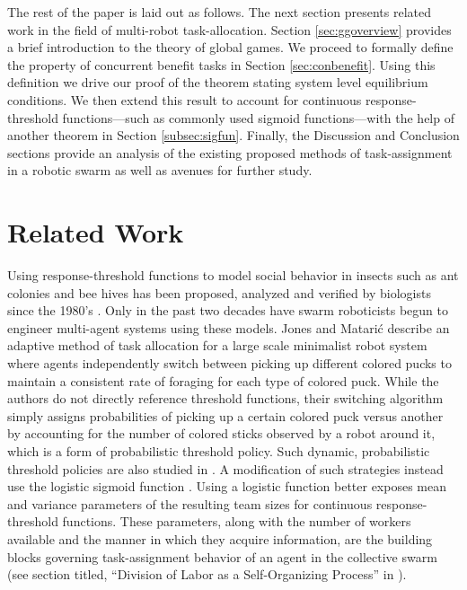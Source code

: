 \documentclass[conference]{ieeeconf}
\begin{document}
The rest of the paper is laid out as follows. The next section presents related work in the field of multi-robot task-allocation. Section \ref{sec:ggoverview} provides a brief introduction to the theory of global games. We proceed to formally define the property of concurrent benefit tasks in Section \ref{sec:conbenefit}. Using this definition we drive our proof of the theorem stating system level equilibrium conditions. We then extend this result to account for continuous response-threshold functions---such as commonly used sigmoid functions---with the help of another theorem in Section \ref{subsec:sigfun}. Finally, the Discussion and Conclusion sections provide an analysis of the existing proposed methods of task-assignment in a robotic swarm as well as avenues for further study.

\section{Related Work}\label{sec:rw}
Using response-threshold functions to model social behavior in insects such as ant colonies \cite{Bonabeau1996, Bonabeau1997} and bee hives \cite{Robinson1987, Robinson1992, PageJr1990} has been proposed, analyzed and verified by biologists since the 1980's \cite{Theraulaz1998}. Only in the past two decades have swarm roboticists begun to engineer multi-agent systems using these models. Jones and Matari\'c \cite{Jones2004} describe an adaptive method of task allocation for a large scale minimalist robot system where agents independently switch between picking up different colored pucks to maintain a consistent rate of foraging for each type of colored puck. While the authors do not directly reference threshold functions, their switching algorithm simply assigns probabilities of picking up a certain colored puck versus another by accounting for the number of colored sticks observed by a robot around it, which is a form of probabilistic threshold policy. Such dynamic, probabilistic threshold policies are also studied in \cite{Nouyan2002}. A modification of such strategies instead use the logistic sigmoid function \cite{Kanakia2014}. Using a logistic function better exposes mean and variance parameters of the resulting team sizes for continuous response-threshold functions. These parameters, along with the number of workers available and the manner in which they acquire information, are the building blocks governing task-assignment behavior of an agent in the collective swarm (see section titled, ``Division of Labor as a Self-Organizing Process'' in \cite{Robinson1992}). 
\end{document}
